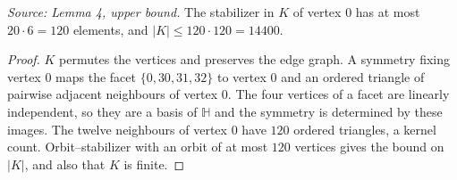 \begin{lemma}
  \label{lem:stabilizer-bound}
  \leanok
  \textit{Source: Lemma 4, upper bound.}
  The stabilizer in \(K\) of vertex \(0\) has at most \(20\cdot6=120\)
  elements, and \(|K|\le120\cdot120=14400\).
\end{lemma}
\begin{proof}
  \leanok
  \(K\) permutes the vertices and preserves the edge graph. A symmetry
  fixing vertex \(0\) maps the facet \(\{0,30,31,32\}\) to vertex \(0\)
  and an ordered triangle of pairwise adjacent neighbours of vertex
  \(0\). The four vertices of a facet are linearly independent, so they
  are a basis of \(\mathbb H\) and the symmetry is determined by these
  images. The twelve neighbours of vertex \(0\) have \(120\) ordered
  triangles, a kernel count. Orbit--stabilizer with an orbit of at most
  \(120\) vertices gives the bound on \(|K|\), and also that \(K\) is
  finite.
\end{proof}

